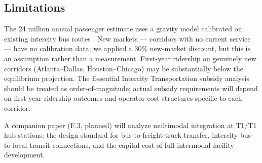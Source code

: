 \subsection{Limitations}

The 24 million annual passenger estimate uses a gravity model calibrated on existing intercity bus routes \citep{BTS_intermodal2023}. New markets --- corridors with no current service --- have no calibration data; we applied a 30\% new-market discount, but this is an assumption rather than a measurement. First-year ridership on genuinely new corridors (Atlanta--Dallas, Houston--Chicago) may be substantially below the equilibrium projection. The Essential Intercity Transportation subsidy analysis should be treated as order-of-magnitude; actual subsidy requirements will depend on first-year ridership outcomes and operator cost structures specific to each corridor.

A companion paper (F.3, planned) will analyze multimodal integration at T1/T1 hub stations: the design standard for bus-to-freight-truck transfer, intercity bus-to-local transit connections, and the capital cost of full intermodal facility development.
